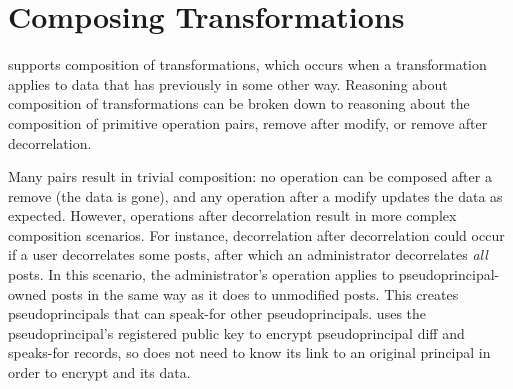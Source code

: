 \section{Composing \Xxing Transformations}
\label{s:composition}

\sys supports composition of \xxing transformations, which occurs when a
transformation applies to data that \sys has previously \xxed in
some other way.
%
Reasoning about composition of transformations can be broken down to reasoning
about the composition of primitive operation pairs, \eg remove after
modify, or remove after decorrelation.
%

%
Many pairs result in trivial composition: no operation can be composed after a
remove (the data is gone), and any operation after a modify updates the
data as expected. 
%
However, operations after decorrelation result in more complex composition scenarios.
%
For instance, decorrelation after decorrelation could occur if a user
decorrelates some posts, after which an administrator decorrelates \emph{all}
posts. In this scenario, the administrator's \xxing operation applies to
pseudoprincipal-owned posts in the same way as it does to unmodified posts. This
creates pseudoprincipals that can speak-for other pseudoprincipals.  \sys uses
the pseudoprincipal's registered public key to encrypt pseudoprincipal diff and
speaks-for records, so \sys does not need to know its link to an original
principal in order to encrypt and \xx its data.
%

